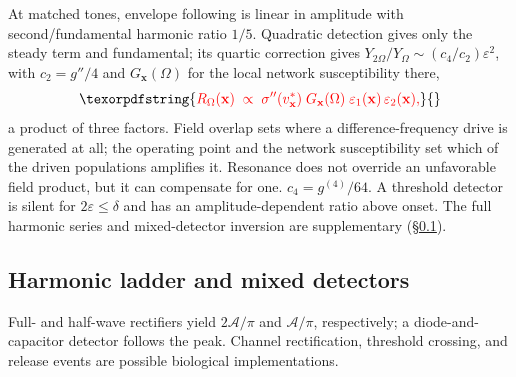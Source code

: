 \documentclass[11pt,a4paper]{article}
\newif\ifjne
\newcommand{\Sig}{\sigma}
\providecommand{\DIFaddtex}[1]{{\protect\color{blue} \sf #1}} %
\providecommand{\DIFdeltex}[1]{{\protect\color{red} \scriptsize #1}} %
\providecommand{\DIFaddbegin}{} %
\providecommand{\DIFaddend}{} %
\providecommand{\DIFdelbegin}{} %
\providecommand{\DIFdelend}{} %
\providecommand{\DIFadd}[1]{\texorpdfstring{\DIFaddtex{#1}}{#1}} %
\providecommand{\DIFdel}[1]{\texorpdfstring{\DIFdeltex{#1}}{}} %
\begin{document}
\DIFadd{At matched tones, envelope following is linear in amplitude with
second/fundamental harmonic ratio $1/5$. Quadratic detection gives only
the steady term and fundamental; its quartic correction gives
$Y_{2\Omega}/Y_\Omega\sim(c_4/c_2)\varepsilon^2$, with
$c_2=g''/4$ }\DIFaddend and \DIFdelbegin \DIFdel{$G_{\mathbf{x}}(\Omega)$ for the local network
susceptibility there, }\begin{displaymath}
\DIFdel{R_\Omega(\mathbf{x})\;\propto\;\Sig''(v^*_{\mathbf{x}})\;G_{\mathbf{x}}(\Omega)\;
\varepsilon_1(\mathbf{x})\,\varepsilon_2(\mathbf{x}),
}\end{displaymath}%
\DIFdel{a product of three factors.
Field overlap sets where a difference-frequency drive is generated at all; the operating point and the network susceptibility set which of the
driven populations amplifies it.
Resonance does not override an unfavorable field
product, but it can compensate for one.
}\DIFdelend \DIFaddbegin \DIFadd{$c_4=g^{(4)}/64$. A threshold detector is silent for
$2\varepsilon\le\delta$ and has an amplitude-dependent ratio above onset.
The full harmonic series and mixed-detector inversion are supplementary
(\S\ref{supp:harmonics}).
}\ifjne\else
\subsection{\DIFadd{Harmonic ladder and mixed detectors}}\label{supp:harmonics}
\DIFadd{Full- and half-wave rectifiers yield $2\mathcal A/\pi$ and
$\mathcal A/\pi$, respectively; a diode-and-capacitor detector follows the
peak. Channel rectification, threshold crossing, and release events are
possible biological implementations.
}\DIFaddend
\end{document}
